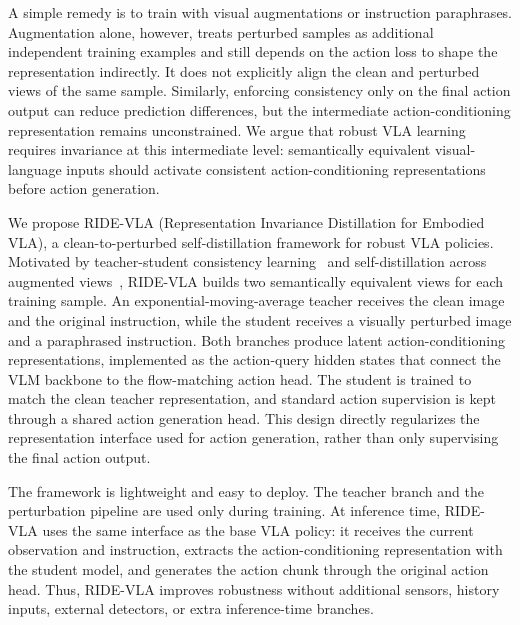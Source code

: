 \documentclass[letterpaper]{article} %
\newcommand{\method}{\textsc{RIDE-VLA}}
\begin{document}
A simple remedy is to train with visual augmentations or instruction paraphrases. Augmentation alone, however, treats perturbed samples as additional independent training examples and still depends on the action loss to shape the representation indirectly. It does not explicitly align the clean and perturbed views of the same sample. Similarly, enforcing consistency only on the final action output can reduce prediction differences, but the intermediate action-conditioning representation remains unconstrained. We argue that robust VLA learning requires invariance at this intermediate level: semantically equivalent visual-language inputs should activate consistent action-conditioning representations before action generation.

We propose \method{} (Representation Invariance Distillation for Embodied VLA), a clean-to-perturbed self-distillation framework for robust VLA policies. Motivated by teacher-student consistency learning~\cite{mean_teacher} and self-distillation across augmented views~\cite{byol}, \method{} builds two semantically equivalent views for each training sample. An exponential-moving-average teacher receives the clean image and the original instruction, while the student receives a visually perturbed image and a paraphrased instruction. Both branches produce latent action-conditioning representations, implemented as the action-query hidden states that connect the VLM backbone to the flow-matching action head. The student is trained to match the clean teacher representation, and standard action supervision is kept through a shared action generation head. This design directly regularizes the representation interface used for action generation, rather than only supervising the final action output.

The framework is lightweight and easy to deploy. The teacher branch and the perturbation pipeline are used only during training. At inference time, \method{} uses the same interface as the base VLA policy: it receives the current observation and instruction, extracts the action-conditioning representation with the student model, and generates the action chunk through the original action head. Thus, \method{} improves robustness without additional sensors, history inputs, external detectors, or extra inference-time branches.
\end{document}
